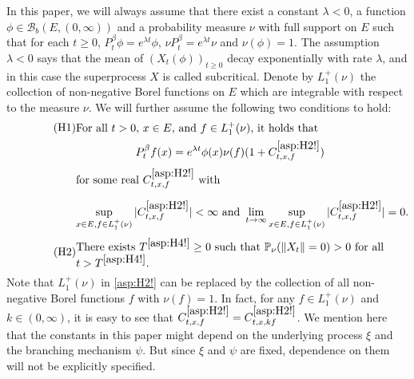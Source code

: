 \documentclass[12pt,a4paper]{amsart}
\numberwithin{equation}{section}
\theoremstyle{plain}
\theoremstyle{definition}
\theoremstyle{remark}
\begin{document}
In this paper, we will always assume that there exist a constant $\lambda<0$,
a function $\phi \in \mathcal B_b(E,(0,\infty))$ and a probability measure $\nu$ with full support on $E$ such that for each $t\geq 0$, $P_t^\beta \phi = e^{\lambda t}\phi$, $\nu P_t^\beta = e^{\lambda t} \nu$ and $\nu(\phi) = 1$.
	The assumption $\lambda<0$ says that the mean of $(X_t(\phi))_{t\geq 0}$ decay exponentially with rate $\lambda$, and in this case the superprocess $X$ is called subcritical.
	Denote by $L_1^+(\nu)$ the collection of
	non-negative Borel functions on $E$ which are integrable with respect to the measure $\nu$.
	We will further assume the following two conditions to hold:
\begin{align}
\label{asp:H2!} \tag{H1}
&\begin{minipage}{0.8\textwidth}
	For all $t>0$, $x\in E$, and $f\in L_1^+(\nu)$, it holds that
\end{minipage}
\\
&\begin{minipage}{0.8\textwidth}
	\[ P_t^\beta f(x) = e^{\lambda t} \phi(x) \nu(f) (1+ C^{\eqref{asp:H2!}}_{t,x,f})\]
	for some real $C^{\eqref{asp:H2!}}_{t,x,f}$ with
	\[\sup_{x\in E, f\in L_1^+(\nu)} |C^{\eqref{asp:H2!}}_{t,x,f}| < \infty
	\mbox{ and }
	\lim_{t\to \infty} \sup_{x\in E, f\in L_1^+(\nu)} |C^{\eqref{asp:H2!}}_{t,x,f}| = 0.\]
\end{minipage}
\end{align}
\begin{equation}
\label{asp:H4!} \tag{H2}
\begin{minipage}{0.8\textwidth}
	There exists  $T^{\eqref{asp:H4!}}\geq 0$ such that $\mathbb P_\nu(\|X_t\| = 0)>0$ for all $t> T^{\eqref{asp:H4!}}$.
\end{minipage}
\end{equation}
	Note that $L_1^+(\nu)$ in \eqref{asp:H2!} can be replaced by the collection of all non-negative Borel functions $f$ with $\nu(f) = 1$.
	In fact, for any $f\in L_1^+(\nu)$ and $k \in (0,\infty)$, it is easy to see that $C^{\eqref{asp:H2!}}_{t,x,f} = C^{\eqref{asp:H2!}}_{t,x,kf}$.
	We  mention here that the constants in this paper might depend on the underlying process $\xi$ and the branching mechanism $\psi$. 
	But since $\xi$ and $\psi$ are fixed, dependence on them will not be explicitly specified.
\end{document}
